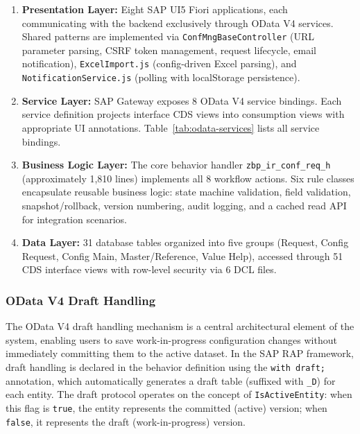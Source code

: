 \documentclass[12pt,a4paper]{report}
\begin{document}
\begin{enumerate}[leftmargin=2em]
  \item \textbf{Presentation Layer:} Eight SAP UI5 Fiori applications, each communicating with the backend exclusively through OData V4 services. Shared patterns are implemented via \texttt{ConfMngBaseController} (URL parameter parsing, CSRF token management, request lifecycle, email notification), \texttt{ExcelImport.js} (config-driven Excel parsing), and \texttt{NotificationService.js} (polling with localStorage persistence).

  \item \textbf{Service Layer:} SAP Gateway exposes 8 OData V4 service bindings. Each service definition projects interface CDS views into consumption views with appropriate UI annotations. Table~\ref{tab:odata-services} lists all service bindings.

  \item \textbf{Business Logic Layer:} The core behavior handler \texttt{zbp\_ir\_conf\_req\_h} (approximately 1,810 lines) implements all 8 workflow actions. Six rule classes encapsulate reusable business logic: state machine validation, field validation, snapshot/rollback, version numbering, audit logging, and a cached read API for integration scenarios.

  \item \textbf{Data Layer:} 31 database tables organized into five groups (Request, Config Request, Config Main, Master/Reference, Value Help), accessed through 51 CDS interface views with row-level security via 6 DCL files.
\end{enumerate}

\subsubsection{OData V4 Draft Handling}

The OData V4 draft handling mechanism is a central architectural element of the system, enabling users to save work-in-progress configuration changes without immediately committing them to the active dataset. In the SAP RAP framework, draft handling is declared in the behavior definition using the \texttt{with draft;} annotation, which automatically generates a draft table (suffixed with \texttt{\_D}) for each entity. The draft protocol operates on the concept of \texttt{IsActiveEntity}: when this flag is \texttt{true}, the entity represents the committed (active) version; when \texttt{false}, it represents the draft (work-in-progress) version.
\end{document}
